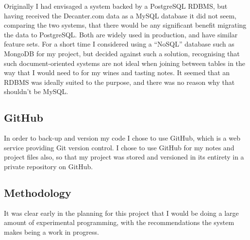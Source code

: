 Originally I had envisaged a system backed by a PostgreSQL\cite{PostgreSQL} RDBMS, but having received the Decanter.com data as a MySQL\cite{MySQL} database it did not seem, comparing the two systems, that there would be any significant benefit migrating the data to PostgreSQL. Both are widely used in production, and have similar feature sets. For a short time I considered using a ``NoSQL'' database such as MongoDB\cite{MongoDB} for my project, but decided against such a solution, recognising that such document-oriented systems are not ideal when joining between tables in the way that I would need to for my wines and tasting notes. It seemed that an RDBMS was ideally suited to the purpose, and there was no reason why that shouldn't be MySQL.

\subsection{GitHub}

In order to back-up and version my code I chose to use GitHub\cite{GitHumSite}, which is a web service providing Git version control. I chose to use GitHub for my notes and project files also, so that my project was stored and versioned in its entirety in a private repository on GitHub.

\subsection{Methodology}

It was clear early in the planning for this project that I would be doing a large amount of experimental programming, with the recommendations the system makes being a work in progress.
